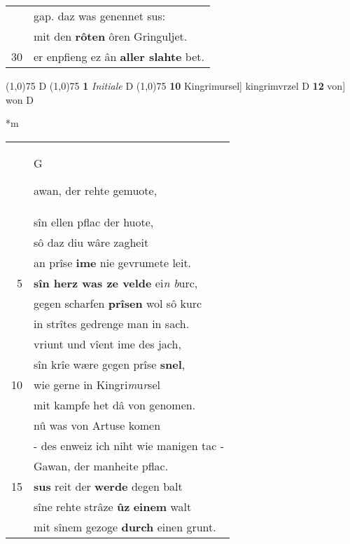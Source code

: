 \documentclass[8pt,a4paper,notitlepage]{article}
\begin{document}
\begin{table}[ht]
\begin{minipage}[t]{0.5\linewidth}
\begin{tabular}{rl}
 & gap. daz was genennet sus:\\ 
 & mit den \textbf{rôten} ôren Gringuljet.\\ 
30 & er enpfieng ez ân \textbf{aller slahte} bet.\\ 
\end{tabular}
\scriptsize
\line(1,0){75} \newline
D \newline
\line(1,0){75} \newline
\textbf{1} \textit{Initiale} D  \newline
\line(1,0){75} \newline
\textbf{10} Kingrimursel] kingrimvrzel D \textbf{12} von] won D \newline
\end{minipage}
\hspace{0.5cm}
\begin{minipage}[t]{0.5\linewidth}
\small
\begin{center}*m
\end{center}
\begin{tabular}{rl}
 & \begin{large}G\end{large}awan, der rehte gemuote,\\ 
 & sîn ellen pflac der huote,\\ 
 & sô daz diu wâre zagheit\\ 
 & an prîse \textbf{ime} nie gevrumete leit.\\ 
5 & \textbf{sîn herz was ze velde} ei\textit{n b}urc,\\ 
 & gegen scharfen \textbf{prîsen} wol sô kurc\\ 
 & in strîtes gedrenge man in sach.\\ 
 & vriunt und vîent ime des jach,\\ 
 & sîn krîe wære gegen prîse \textbf{snel},\\ 
10 & wie gerne in Kingri\textit{m}u\textit{r}sel\\ 
 & mit kampfe het dâ von genomen.\\ 
 & nû was von Artuse komen\\ 
 & - des enweiz ich niht wie manigen tac -\\ 
 & Gawan, der manheite pflac.\\ 
15 & \textbf{sus} reit der \textbf{werde} degen balt\\ 
 & sîne rehte strâze \textbf{ûz} \textbf{einem} walt\\ 
 & mit sînem gezoge \textbf{durch} einen grunt.\\ 

\end{tabular}
\end{minipage}
\end{table}
\end{document}
